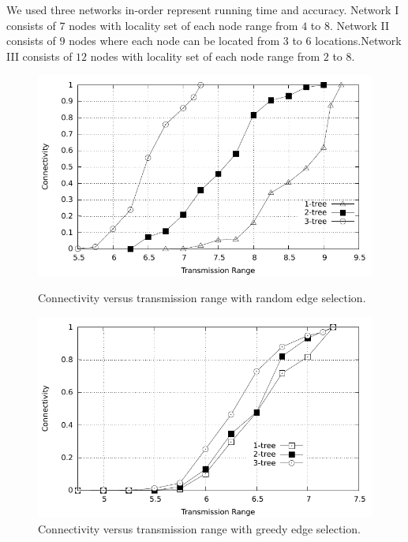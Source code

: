 \documentclass[11pt]{article}
\begin{document}
We used three networks in-order represent running time and accuracy. Network I consists of $7$ nodes with locality set of each node range from $4$ to $8$. Network II consists of $9$ nodes where each node can be located from $3$ to $6$ locations.Network III consists of $12$ nodes with locality set of each node range from $2$ to $8$.
\begin{figure}
\begin{minipage}[]{.5\linewidth}
\includegraphics[width=3 in, height=2.5 in]{random.pdf}
 \caption{ Connectivity versus transmission range with  random edge selection.
}
\label{fig:res}
\end{minipage}
\begin{minipage}{.5\linewidth}
\includegraphics[width=3 in, height=2.5 in]{Greedy.pdf}
 \caption{ Connectivity versus transmission range with greedy edge selection.
}
\label{fig:ges}
 \end{minipage}
\end{figure}
\end{document}
